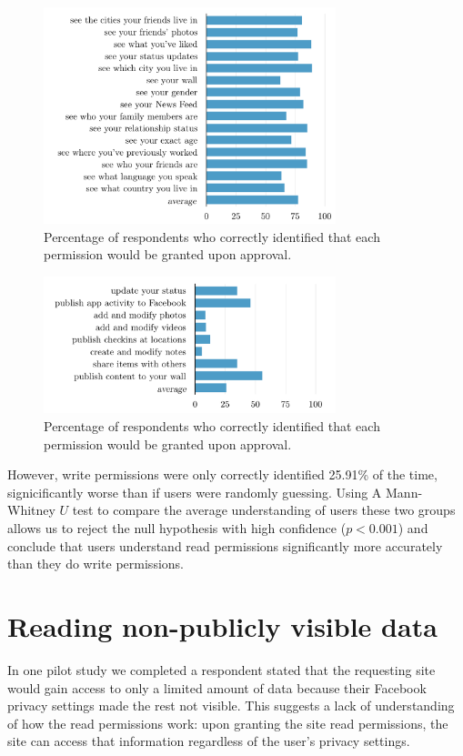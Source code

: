 \documentclass[twoside,letterpaper]{soups-poster}
\begin{document}
\begin{figure}[tbh!]
  \centering
  \includegraphics[width=8.5cm]{read_percents_cosn}
  \caption{Percentage of respondents who correctly identified that each permission would be granted upon approval.}
  \label{figure:readpercents}
\end{figure}

\begin{figure}[h!]
  \centering
  \includegraphics[width=8.5cm]{write_percents_cosn}
  \caption{Percentage of respondents who correctly identified that each permission would be granted upon approval.}
  \label{figure:writepercents}
\end{figure}

However, write permissions were only correctly identified 25.91\% of the time, signicificantly worse than if users were randomly guessing.
Using A Mann-Whitney $U$ test to compare the average understanding of users these two groups allows us to reject the null hypothesis with high confidence ($p < 0.001$) and conclude that users understand read permissions significantly more accurately than they do write permissions.


\section{Reading non-publicly visible data}

In one pilot study we completed a respondent stated that the requesting site would gain access to only a limited amount of data because their Facebook privacy settings made the rest not visible.
This suggests a lack of understanding of how the read permissions work: upon granting the site read permissions, the site can access that information regardless of the user's privacy settings.
\end{document}
